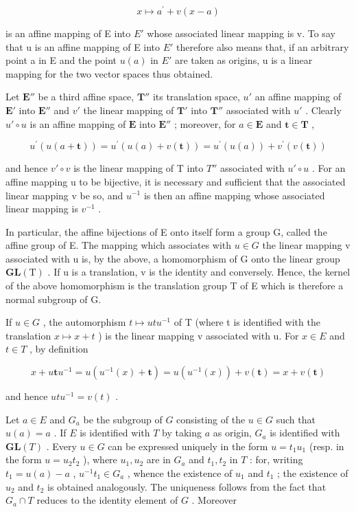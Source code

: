 \[
x \mapsto a ^ {\prime} + v (x - a)
\]

is an affine mapping of E into \(E'\) whose associated linear mapping is v. To say that u is an affine mapping of E into \(E'\) therefore also means that, if an arbitrary point a in E and the point \(u(a)\) in \(E'\) are taken as origins, u is a linear mapping for the two vector spaces thus obtained.

Let \(\mathbf{E}''\) be a third affine space, \(\mathbf{T}''\) its translation space, \(u'\) an affine mapping of \(\mathbf{E}'\) into \(\mathbf{E}''\) and \(v'\) the linear mapping of \(\mathbf{T}'\) into \(\mathbf{T}''\) associated with \(u'\) . Clearly \(u' \circ u\) is an affine mapping of \(\mathbf{E}\) into \(\mathbf{E}''\) ; moreover, for \(a \in \mathbf{E}\) and \(\mathbf{t} \in \mathbf{T}\) ,

\[
u ^ {\prime} (u (a + \mathbf {t})) = u ^ {\prime} (u (a) + v (\mathbf {t})) = u ^ {\prime} (u (a)) + v ^ {\prime} (v (\mathbf {t}))
\]

and hence \(v'\circ v\) is the linear mapping of T into \(T''\) associated with \(u'\circ u\) . For an affine mapping u to be bijective, it is necessary and sufficient that the associated linear mapping v be so, and \(u^{-1}\) is then an affine mapping whose associated linear mapping is \(v^{-1}\) .

In particular, the affine bijections of E onto itself form a group G, called the affine group of E. The mapping which associates with \(u \in G\) the linear mapping v associated with u is, by the above, a homomorphism of G onto the linear group \(\mathbf{GL}(\mathrm{T})\) . If u is a translation, v is the identity and conversely. Hence, the kernel of the above homomorphism is the translation group T of E which is therefore a normal subgroup of G.

If \(u \in G\) , the automorphism \(t \mapsto utu^{-1}\) of T (where t is identified with the translation \(x \mapsto x + t\) ) is the linear mapping v associated with u. For \(x \in E\) and \(t \in T\) , by definition

\[
x + u \mathbf {t} u ^ {- 1} = u (u ^ {- 1} (x) + \mathbf {t}) = u (u ^ {- 1} (x)) + v (\mathbf {t}) = x + v (\mathbf {t})
\]

and hence \(utu^{-1} = v(t)\) .

Let \(a \in E\) and \(G_a\) be the subgroup of \(G\) consisting of the \(u \in G\) such that \(u(a) = a\) . If \(E\) is identified with \(T\) by taking \(a\) as origin, \(G_a\) is identified with \(\mathbf{GL}(T)\) . Every \(u \in G\) can be expressed uniquely in the form \(u = t_1 u_1\) (resp. in the form \(u = u_2 t_2\) ), where \(u_1, u_2\) are in \(G_a\) and \(t_1, t_2\) in \(T\) : for, writing \(t_1 = u(a) - a\) , \(u^{-1} t_1 \in G_a\) , whence the existence of \(u_1\) and \(t_1\) ; the existence of \(u_2\) and \(t_2\) is obtained analogously. The uniqueness follows from the fact that \(G_a \cap T\) reduces to the identity element of \(G\) . Moreover

